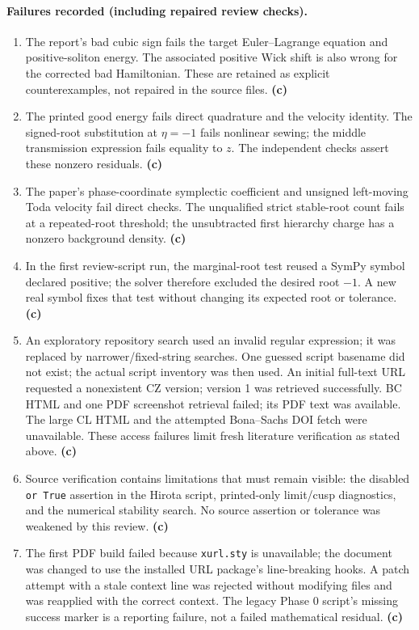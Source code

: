 \documentclass[11pt,a4paper]{article}
\newcommand{\C}{\textsf{\textbf{(c)}}}
\newcommand{\file}[1]{\nolinkurl{#1}}
\begin{document}
\paragraph{Failures recorded (including repaired review checks).}
\begin{enumerate}[leftmargin=*]
\item The report's bad cubic sign fails the target Euler--Lagrange equation
and positive-soliton energy. The associated positive Wick shift is also
wrong for the corrected bad Hamiltonian. These are retained as explicit
counterexamples, not repaired in the source files. \C
\item The printed good energy fails direct quadrature and the velocity
identity. The signed-root substitution at $\eta=-1$ fails nonlinear sewing;
the middle transmission expression fails equality to $z$. The independent
checks assert these nonzero residuals. \C
\item The paper's phase-coordinate symplectic coefficient and unsigned
left-moving Toda velocity fail direct checks. The unqualified strict
stable-root count fails at a repeated-root threshold; the unsubtracted
first hierarchy charge has a nonzero background density. \C
\item In the first review-script run, the marginal-root test reused a
SymPy symbol declared positive; the solver therefore excluded the desired
root $-1$. A new real symbol fixes that test without changing its expected
root or tolerance. \C
\item An exploratory repository search used an invalid regular expression;
it was replaced by narrower/fixed-string searches. One guessed script
basename did not exist; the actual script inventory was then used.
An initial full-text URL requested a nonexistent CZ version; version 1
was retrieved successfully. BC HTML and one PDF screenshot retrieval
failed; its PDF text was available. The large CL HTML and the attempted
Bona--Sachs DOI fetch were unavailable. These access failures limit fresh
literature verification as stated above. \C
\item Source verification contains limitations that must remain visible:
the disabled \file{or True} assertion in the Hirota script, printed-only
limit/cusp diagnostics, and the numerical stability search. No source
assertion or tolerance was weakened by this review. \C
\item The first PDF build failed because \file{xurl.sty} is unavailable;
the document was changed to use the installed URL package's line-breaking
hooks. A patch attempt with a stale context line was rejected without
modifying files and was reapplied with the correct context. The legacy
Phase 0 script's missing success marker is a reporting failure, not a
failed mathematical residual. \C
\end{enumerate}
\end{document}
